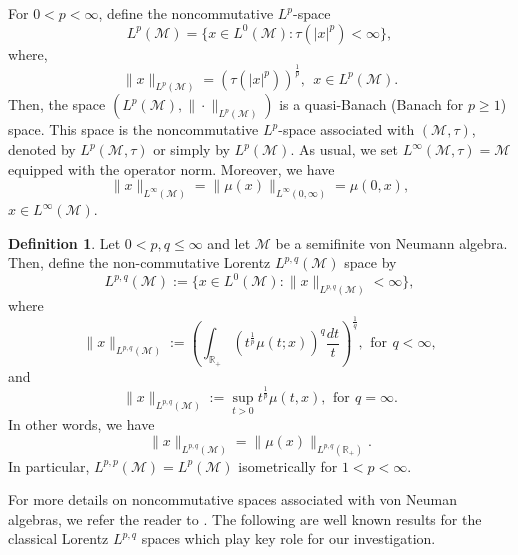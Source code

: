 \documentclass[a4paper,12pt]{amsart}
\numberwithin{equation}{section}
\theoremstyle{definition}
\newtheorem{defn}[thm]{Definition}
\begin{document}
For $0<p<\infty$, define the noncommutative $L^p$-space
$$L^{p}(\mathcal{M})=\{x\in L^{0}(\mathcal{M}):\tau\left(|x|^{p}\right)<\infty\},$$
where,
$$\|x\|_{L^{p}(\mathcal{M})}=\left(\tau\left(|x|^{p}\right)\right)^{\frac1p}, \,\;x\in L^{p}(\mathcal{M}).$$
Then, the space $\left(L^{p}(\mathcal{M}), \|\cdot\|_{L^{p}(\mathcal{M})}\right)$ is a quasi-Banach (Banach for $p\geq 1$) space. This space is the
noncommutative $L^{p}$-space associated with $(\mathcal{M},\tau)$, denoted by $L^{p}(\mathcal{M},\tau)$ or simply
by $L^{p}(\mathcal{M})$. As usual, we set $L^{\infty}(\mathcal{M},\tau)=\mathcal{M}$ equipped with the operator norm. Moreover, we have $$\|x\|_{L^{\infty}(\mathcal{M})}=\|\mu(x)\|_{L^{\infty}(0,\infty)}=\mu(0,x),$$ $x\in L^{\infty}(\mathcal{M}).$

\begin{defn}Let $0 < p, q\leq \infty$ and let $\mathcal{M}$ be a semifinite von Neumann algebra. Then, define the non-commutative Lorentz $L^{p,q}(\mathcal{M})$ space by
$$L^{p,q}(\mathcal{M}):=\{x\in L^{0}(\mathcal{M}):\|x\|_{L^{p,q}(\mathcal{M})}<\infty\},$$
where
$$
\|x\|_{L^{p,q}(\mathcal{M})}:=\left(\int_{
\mathbb{R}_+}\left(t^\frac{1}{p}\mu(t;x)\right)^{q}\frac{dt}{t}\right)^{\frac1q},\,\ \text{for} \,\ q<\infty,
$$
and 
$$\|x\|_{L^{p,q}(\mathcal{M})}:=\sup_{t>0}t^{\frac{1}{p}}\mu(t,x), \,\ \text{for} \,\ q=\infty.$$
In other words, we have 
\begin{equation}\label{NC Lorentz space norm II}\|x\|_{L^{p,q}(\mathcal{M})}=\|\mu(x)\|_{L^{p,q}(\mathbb{R}_+)}.
\end{equation}
In particular,
$L^{p,p}(\mathcal{M})=L^p(\mathcal{M})$ isometrically for $1<p<\infty.$
\end{defn}
For more details on noncommutative spaces associated with von Neuman algebras, we refer the reader to \cite{DPS, LSZ, PXu}.
The following are well known results for the classical Lorentz $L^{p,q}$ spaces which play key role for our investigation.
\end{document}
